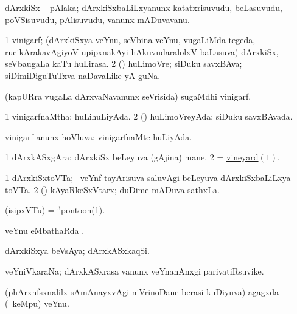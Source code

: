 \bentry
{} 
\gl{\nA}
\expl{}
\bmng
 dArxkiSx -- pAlaka; dArxkiSxbaLiLxyanunx katatxrisuvudu, beLasuvudu, poVSisuvudu, pAlisuvudu, \mo vanunx mADuvavanu. 
\emng
\eentry

\bentry
{} 
\gl{\nA}
\expl{}
\bmng
\bnum
\num{1} vinigarf; (dArxkiSxya veYnu, seVbina veYnu, \mo vugaLiMda tegeda, rucikArakavAgiyoV upipxnakAyi hAkuvudaralolxV baLasuva) dArxkiSx, seVbaugaLa kaTu huLirasa. 
\num{2} (\rUpa) huLimoVre; siDuku savxBAva; siDimiDiguTuTxva naDavaLike yA guNa. 
\enum
\emng

\noindent 
\gl{\pagu}
\expl{}
\bmng
{}  (kapURra \mo vugaLa dArxvaNavanunx seVrisida) sugaMdhi vinigarf. 
\emng
\eentry

\bentry 
{} 
\gl{\gu}
\expl{}
\bmng
\bnum
\num{1} vinigarfnaMtha; huLihuLiyAda. 
\num{2} (\rUpa) huLimoVreyAda; siDuku savxBAvada. 
\enum
\emng
\eentry

\bentry
{} 
\gl{\gu}
\expl{}
\bmng
 vinigarf anunx hoVluva; vinigarfnaMte huLiyAda. 
\emng
\eentry

\bentry
{} 
\gl{\nA}
\bmng
\bnum
\num{1} dArxkASxgAra; dArxkiSx beLeyuva (gAjina) mane. 
\num{2} = \hyperlink{vineyard}{vineyard\((1)\)}. 
\enum
\emng
\eentry

\bentry
{} 
\gl{\nA}
\expl{}
\bmng
\bnum
\num{1} dArxkiSxtoVTa; \kanmu\ veYnf tayArisuva saluvAgi beLeyuva dArxkiSxbaLiLxya toVTa. 
\num{2} (\beY) kAyaRkeSxVtarx; duDime mADuva sathxLa. 
\enum
\emng
\eentry

\bentry 
{} 
\gl{\nA}
\expl{\F\ }
\bmng
 (isipxVTu) = \hyperref{kandict_p.pdf}{P}{pontoon(3)}{$^3$pontoon(1)}. 
\emng
\eentry

\bentry
{} 
\gl{\sapUpa}
\expl{}
\bmng
 veYnu eMbathaRda \sapUpa. 
\emng
\eentry

\bentry
{} 
\gl{\nA}
\expl{}
\bmng
 dArxkiSxya beVsAya; dArxkASxkaqSi. 
\emng
\eentry

\bentry
{} 
\gl{\nA}
\expl{}
\bmng
 veYniVkaraNa; dArxkASxrasa \mo vanunx veYnanAnxgi parivatiRsuvike. 
\emng
\eentry

\bentry 
{} 
\gl{\nA}
\expl{\F}
\bmng
 (phArxnfsxnalilx sAmAnayxvAgi niVrinoDane berasi kuDiyuva) agagxda (\sA\ keMpu) veYnu. 
\emng
\eentry

